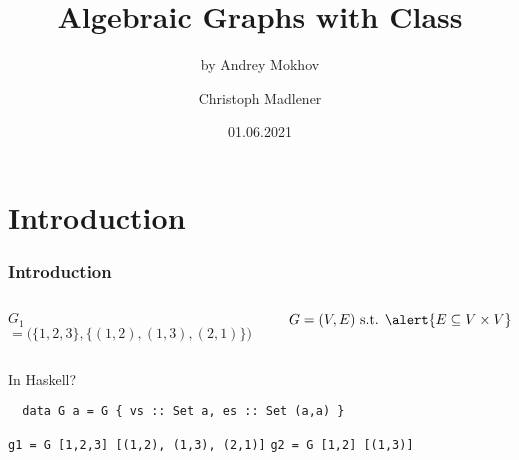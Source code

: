 \documentclass{beamer}
\title{Algebraic Graphs with Class}
\subtitle{by Andrey Mokhov}
\author{Christoph Madlener}
\date{01.06.2021}
\newcommand{\hs}{\texttt}
\begin{document}
\begin{frame}[plain]
  \titlepage{}
\end{frame}

\section{Introduction}
\begin{frame}[fragile]
  \frametitle{Introduction}

  \begin{columns}
    \begin{column}{.6\linewidth}
      \centering
      
      \vspace{2mm}
      $G_1$${} = \Big(\big\{1,2,3\big\}, \big\{(1,2), (1,3), (2,1)\big\}\Big)$
    \end{column}
    \begin{column}{.5\linewidth}
      \[
        G = (V,E) \text{ s.t. } \alert{E \subseteq V \times V}
      \]
    \end{column}
  \end{columns}

  \begin{alertblock}{In Haskell?}
    \begin{verbatim}
  data G a = G { vs :: Set a, es :: Set (a,a) }
    \end{verbatim}
    \hs{g1 = G [1,2,3] [(1,2), (1,3), (2,1)]} 
    \hs{g2 = G [1,2] [(1,3)]} 
  \end{alertblock}
\end{frame}
\end{document}
